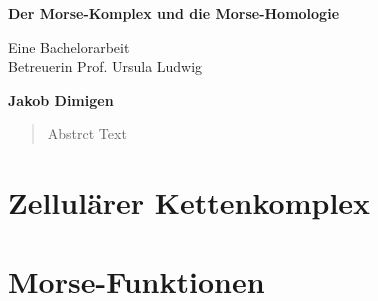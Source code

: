 \documentclass[a4paper,11pt]{article}
\begin{document}
\begin{titlepage}
    \begin{center}
        \vspace*{1cm}
 
        \Large{\textbf{Der Morse-Komplex und die Morse-Homologie}}
 
        \vspace{0.5cm}
        Eine Bachelorarbeit \\ 
        Betreuerin Prof. Ursula Ludwig
             
        \vspace{1.5cm}
 
        \textbf{Jakob Dimigen}
             
    \end{center}
\end{titlepage}

\begin{abstract}
    Abstrct Text
\end{abstract}

\section{Zellulärer Kettenkomplex}

\begin{definition}[CW-Komplex]

\end{definition}

\begin{definition}

\end{definition}

\section{Morse-Funktionen}

\begin{definition}

\end{definition}

\begin{definition}

\end{definition}

\begin{lemma}

\end{lemma}
\end{document}
